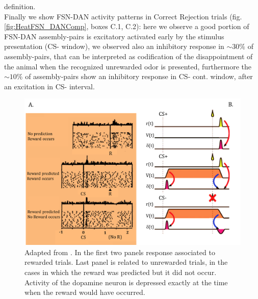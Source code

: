 definition.\\ Finally we show FSN-DAN activity patterns in Correct Rejection trials (fig.\ref{fig:HeatFSN_DANComp}, boxes C.1, C.2): here we observe a good portion of FSN-DAN assembly-pairs is excitatory activated early by the stimulus presentation (CS- window), we observed also an inhibitory response in $\sim30\%$ of assembly-pairs, that can be interpreted as codification of the disappointment of the animal when the recognized unrewarded odor is presented, furthermore the $\sim10\%$ of assembly-pairs show an inhibitory response in CS- cont. window, after an excitation in CS- interval.
\begin{figure}
    \centering
    \includegraphics[scale=0.6]{figures/RewardDoyaRLSUM.png}
    \caption{Adapted from \cite{Doya}. In the first two panels response associated to rewarded trials. Last panel is related to unrewarded trials, in the cases in which the reward was predicted but it did not occur. Activity of the dopamine neuron is depressed exactly at the time when the reward would have occurred.}
    \label{fig:RewardDoya}
\end{figure}
